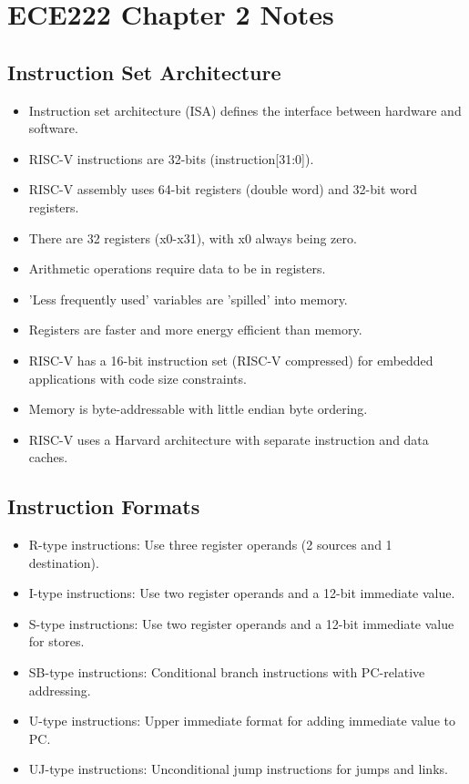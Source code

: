 \documentclass{article}
\begin{document}
\section*{ECE222 Chapter 2 Notes}

\subsection*{Instruction Set Architecture}
\begin{itemize}
    \item Instruction set architecture (ISA) defines the interface between hardware and software.
    \item RISC-V instructions are 32-bits (instruction[31:0]).
    \item RISC-V assembly uses 64-bit registers (double word) and 32-bit word registers.
    \item There are 32 registers (x0-x31), with x0 always being zero.
    \item Arithmetic operations require data to be in registers.
    \item 'Less frequently used' variables are 'spilled' into memory.
    \item Registers are faster and more energy efficient than memory.
    \item RISC-V has a 16-bit instruction set (RISC-V compressed) for embedded applications with code size constraints.
    \item Memory is byte-addressable with little endian byte ordering.
    \item RISC-V uses a Harvard architecture with separate instruction and data caches.
\end{itemize}

\subsection*{Instruction Formats}
\begin{itemize}
    \item R-type instructions: Use three register operands (2 sources and 1 destination).
    \item I-type instructions: Use two register operands and a 12-bit immediate value.
    \item S-type instructions: Use two register operands and a 12-bit immediate value for stores.
    \item SB-type instructions: Conditional branch instructions with PC-relative addressing.
    \item U-type instructions: Upper immediate format for adding immediate value to PC.
    \item UJ-type instructions: Unconditional jump instructions for jumps and links.
\end{itemize}
\end{document}
